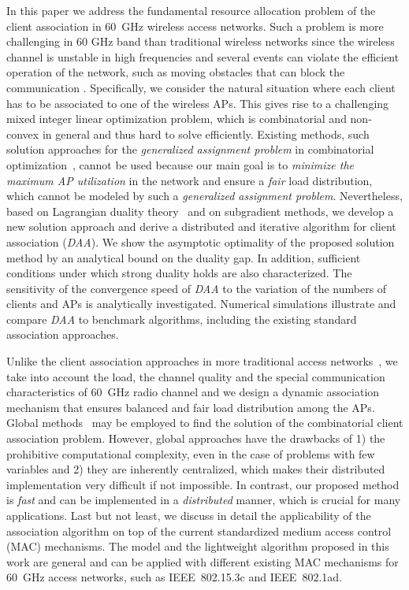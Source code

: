 \documentclass[journal, 10pt, twocolumn]{IEEEtran}
\begin{document}
In this paper we address the fundamental resource allocation problem of the client association in 60~GHz wireless access networks. Such a problem is more challenging in 60 GHz band than traditional wireless networks since the wireless channel is unstable in high frequencies and several events can violate the efficient operation of the network, such as moving obstacles that can block the communication \cite{Singh07}. Specifically, we consider the natural situation where each client has to be associated to one of the wireless APs. This gives rise to a challenging mixed integer linear optimization problem, which is combinatorial and non-convex in general and thus hard to solve efficiently.
Existing methods, such solution approaches for the \emph{generalized assignment problem} in combinatorial optimization~\cite[\S~8]{Bertsekas-98}, cannot be used because our main goal is to \emph{minimize the maximum AP utilization} in the network and ensure a \emph{fair} load distribution, which cannot be modeled by such a \emph{generalized assignment problem}. Nevertheless, based on Lagrangian duality theory~\cite[\S~5]{Boyd-Vandenberghe-04} and on subgradient methods, we develop a new solution approach and derive a distributed and iterative algorithm for client association (\emph{DAA}). We show the asymptotic optimality of the proposed solution method by an analytical bound on the duality gap. In addition, sufficient conditions under which strong duality holds are also characterized. The sensitivity of the convergence speed of \emph{DAA} to the variation of the numbers of clients and APs is analytically investigated. Numerical simulations illustrate and compare \emph{DAA} to benchmark algorithms, including the existing standard association approaches.

Unlike the client association approaches in more traditional access networks~\cite{Bejerano1}, we take into account the load, the channel quality and the special communication characteristics of 60~GHz radio channel and we design a dynamic association mechanism that ensures balanced and fair load distribution among the APs. Global methods~\cite{Horst-Pardalos-Toai-00} may be employed to find the solution of the combinatorial client association problem. However, global approaches have the drawbacks of 1) the prohibitive computational complexity, even in the case of problems with few variables and 2) they are inherently centralized, which makes their distributed implementation very difficult if not impossible. 
In contrast, our proposed method is \emph{fast} and can be implemented in a \emph{distributed} manner, which is crucial for many applications. Last but not least, we discuss in detail the applicability of the association algorithm on top of the current standardized medium access control (MAC) mechanisms. 
The model and the lightweight algorithm proposed in this work are general and can be applied with different existing MAC mechanisms for 60~GHz access networks, such as IEEE~802.15.3c and IEEE~802.1ad. 
\end{document}
